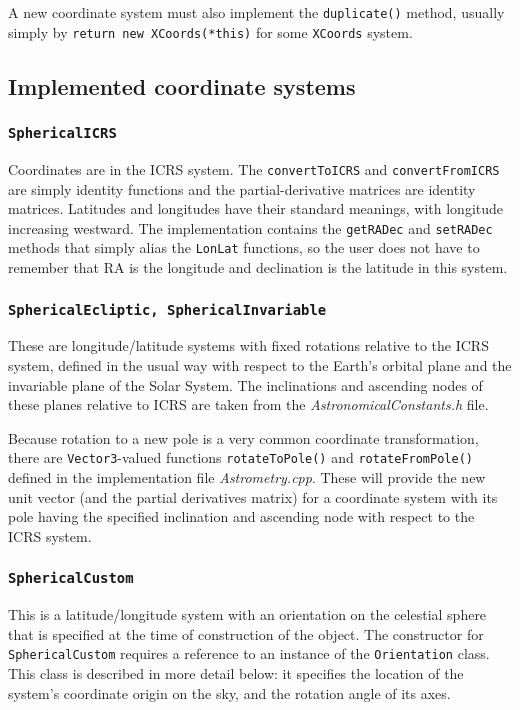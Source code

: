 \documentclass[11pt,preprint,flushrt]{aastex}
\begin{document}
A new coordinate system must also implement the {\tt duplicate()} method, usually simply by {\tt return new XCoords(*this)} for some {\tt XCoords} system.

\subsection{Implemented coordinate systems}
\subsubsection{{\tt SphericalICRS}}
Coordinates are in the ICRS system.  The {\tt convertToICRS} and {\tt convertFromICRS} are simply identity functions and the partial-derivative matrices are identity matrices.  Latitudes and longitudes have their standard meanings, with longitude increasing westward.  The implementation contains the {\tt getRADec} and {\tt setRADec} methods that simply alias the {\tt LonLat} functions, so the user does not have to remember that RA is the longitude and declination is the latitude in this system.

\subsubsection{\tt SphericalEcliptic, SphericalInvariable}
These are longitude/latitude systems with fixed rotations relative to the ICRS system, defined in the usual way with respect to the Earth's orbital plane and the invariable plane of the Solar System.  The inclinations and ascending nodes of these planes relative to ICRS are taken from the {\it AstronomicalConstants.h} file.

Because rotation to a new pole is a very common coordinate transformation, there are {\tt Vector3}-valued functions {\tt rotateToPole()} and {\tt rotateFromPole()} defined in the implementation file {\it Astrometry.cpp}.  These will provide the new unit vector (and the partial derivatives matrix) for a coordinate system with its pole having the specified inclination and ascending node with respect to the ICRS system.  

\subsubsection{\tt SphericalCustom}
This is a latitude/longitude system with an orientation on the celestial sphere that is specified at the time of construction of the object.  The constructor for {\tt SphericalCustom} requires a reference to an instance of the {\tt Orientation} class.  This class is described in more detail below: it specifies the location of the system's coordinate origin on the sky, and the rotation angle of its axes.  
\end{document}
